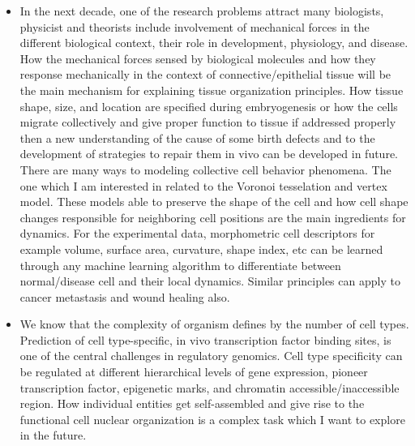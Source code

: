 \documentclass{res}
\begin{document}
\begin{resume}
\begin{itemize}
\begin{itemize}
\item In the next decade, one of the research problems attract many biologists, physicist and theorists include involvement of mechanical forces in the different biological context, their role in development, physiology, and disease. How the mechanical forces sensed by biological molecules and how they response mechanically in the context of connective/epithelial tissue will be the main mechanism for explaining tissue organization principles. How tissue shape, size, and location are specified during embryogenesis or how the cells migrate collectively and give proper function to tissue if addressed properly then a new understanding of the cause of some birth defects and to the development of strategies to repair them in vivo can be developed in future. There are many ways to modeling collective cell behavior phenomena. The one which I am interested in related to the Voronoi tesselation and vertex model. These models able to preserve the shape of the cell and how cell shape changes responsible for neighboring cell positions are the main ingredients for dynamics. For the experimental data, morphometric cell descriptors for example volume, surface area, curvature, shape index, etc can be learned through any machine learning algorithm to differentiate between normal/disease cell and their local dynamics. Similar principles can apply to cancer metastasis and wound healing also.   



\item We know that the complexity of organism defines by the number of cell types. Prediction of cell type-specific, in vivo transcription factor binding sites, is one of the central challenges in regulatory genomics. Cell type specificity can be regulated at different hierarchical levels of gene expression, pioneer transcription factor, epigenetic marks, and chromatin accessible/inaccessible region. How individual entities get self-assembled and give rise to the functional cell nuclear organization is a complex task which I want to explore in the future. 


\end{itemize}
\end{itemize}
\end{resume}
\end{document}
